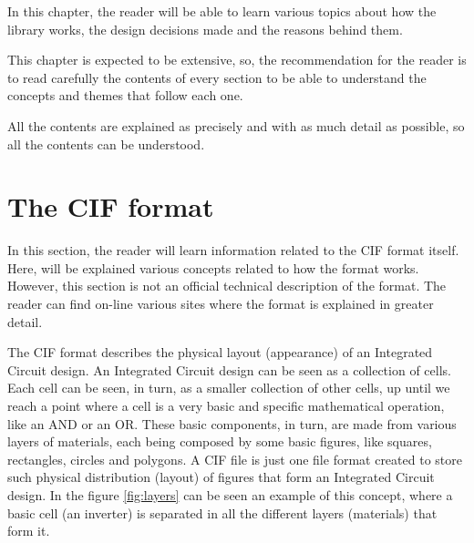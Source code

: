 \documentclass[11pt,twoside,openany,x11names,svgnames]{memoir}
\begin{document}
In this chapter, the reader will be able to learn various topics about how the library works, the design decisions made and the reasons behind them.

This chapter is expected to be extensive, so, the recommendation for the reader is to read carefully the contents of every section to be able to understand the concepts and themes that follow each one.

All the contents are explained as precisely and with as much detail as possible, so all the contents can be understood.
\newpage 

\section{The CIF format}\label{The-CIF-format}

In this section, the reader will learn information related to the CIF format itself. Here, will be explained various concepts related to how the format works. However, this section is not an official technical description of the format. The reader can find on-line various sites where the format is explained in greater detail.

The CIF format describes the physical layout (appearance) of an Integrated Circuit design. An Integrated Circuit design can be seen as a collection of cells. Each cell can be seen, in turn, as a smaller collection of other cells, up until we reach a point where a cell is a very basic and specific mathematical operation, like an AND or an OR. These basic components, in turn, are made from various layers of materials, each being composed by some basic figures, like squares, rectangles, circles and polygons. A CIF file is just one file format created to store such physical distribution (layout) of figures that form an Integrated Circuit design. In the figure \ref{fig:layers} can be seen an example of this concept, where a basic cell (an inverter) is separated in all the different layers (materials) that form it.
\end{document}
